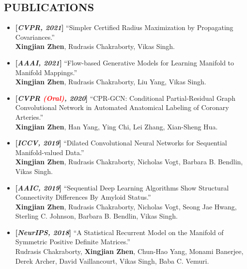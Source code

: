 \documentclass[margin]{res}
\begin{document}
\begin{resume}
\section{PUBLICATIONS}
                \begin{itemize}[noitemsep,wide=0pt,leftmargin=\dimexpr{} + 2\relax]\itemsep -0.0pt
                \item \textbf{[\emph{CVPR, 2021}]} ``Simpler Certified Radius Maximization by Propagating Covariances.''\\
                            \textbf{Xingjian Zhen}, Rudrasis Chakraborty, Vikas Singh.
                \item \textbf{[\emph{AAAI, 2021}]} ``Flow-based Generative Models for Learning Manifold to Manifold Mappings.''\\
                            \textbf{Xingjian Zhen}, Rudrasis Chakraborty, Liu Yang, Vikas Singh.   
                \item \textbf{[\emph{CVPR \textcolor{red}{(Oral)}, 2020}]} ``CPR-GCN: Conditional Partial-Residual Graph Convolutional Network in Automated Anatomical Labeling of Coronary Arteries.''\\
                            \textbf{Xingjian Zhen}, Han Yang, Ying Chi, Lei Zhang, Xian-Sheng Hua.   
                \item \textbf{[\emph{ICCV, 2019}]} ``Dilated Convolutional Neural Networks for Sequential Manifold-valued Data.'' \\
                             \textbf{Xingjian Zhen}, Rudrasis Chakraborty, Nicholas Vogt, Barbara B. Bendlin, Vikas Singh. 
                \item \textbf{[\emph{AAIC, 2019}]} ``Sequential Deep Learning Algorithms Show Structural Connectivity Differences By Amyloid Status.''\\
                             \textbf{Xingjian Zhen}, Rudrasis Chakraborty, Nicholas Vogt, Seong Jae Hwang, Sterling C. Johnson, Barbara B. Bendlin, Vikas Singh. 
                \item \textbf{[\emph{NeurIPS, 2018}]} ``A Statistical Recurrent Model on the Manifold of Symmetric Positive Definite Matrices.''\\
                             Rudrasis Chakraborty, \textbf{Xingjian Zhen}, Chun-Hao Yang, Monami Banerjee, Derek Archer, David Vaillancourt, Vikas Singh, Baba C. Vemuri.
                \end{itemize}

\vspace{-2em}                

\end{resume}
\end{document}
